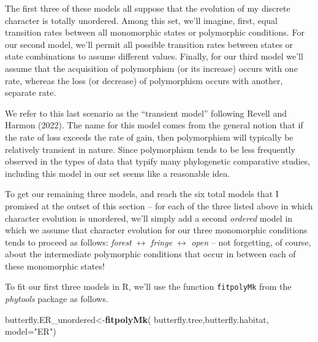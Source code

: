 \documentclass[fleqn,10pt,lineno]{wlpeerj} %
\newenvironment{Shaded}{\begin{snugshade}}{\end{snugshade}}
\newcommand{\AttributeTok}[1]{\textcolor[rgb]{0.13,0.29,0.53}{#1}}
\newcommand{\FunctionTok}[1]{\textcolor[rgb]{0.13,0.29,0.53}{\textbf{#1}}}
\newcommand{\NormalTok}[1]{#1}
\newcommand{\OtherTok}[1]{\textcolor[rgb]{0.56,0.35,0.01}{#1}}
\newcommand{\StringTok}[1]{\textcolor[rgb]{0.31,0.60,0.02}{#1}}
\begin{document}
The first three of these models all suppose that the evolution of my discrete character is totally unordered. Among this set, we'll imagine, first, equal transition rates between all monomorphic states or polymorphic conditions. For our second model, we'll permit all possible transition rates between states or state combinations to assume different values. Finally, for our third model we'll assume that the acquisition of polymorphism (or its increase) occurs with one rate, whereas the loss (or decrease) of polymorphism occurs with another, separate rate.

We refer to this last scenario as the ``transient model'' following Revell and Harmon (2022). The name for this model comes from the general notion that if the rate of loss exceeds the rate of gain, then polymorphism will typically be relatively transient in nature. Since polymorphism tends to be less frequently observed in the types of data that typify many phylogenetic comparative studies, including this model in our set seems like a reasonable idea.

To get our remaining three models, and reach the six total models that I promised at the outset of this section -- for each of the three listed above in which character evolution is unordered, we'll simply add a second \emph{ordered} model in which we assume that character evolution for our three monomorphic conditions tends to proceed as follows: \emph{forest} \(\leftrightarrow\) \emph{fringe} \(\leftrightarrow\) \emph{open} -- not forgetting, of course, about the intermediate polymorphic conditions that occur in between each of these monomorphic states!

To fit our first three models in R, we'll use the function \texttt{fitpolyMk} from the \emph{phytools} package as follows.

\begin{Shaded}
\begin{Highlighting}[]
\NormalTok{butterfly.ER\_unordered}\OtherTok{\textless{}{-}}\FunctionTok{fitpolyMk}\NormalTok{(}
\NormalTok{  butterfly.tree,butterfly.habitat,}
  \AttributeTok{model=}\StringTok{"ER"}\NormalTok{)}
\end{Highlighting}
\end{Shaded}
\end{document}
